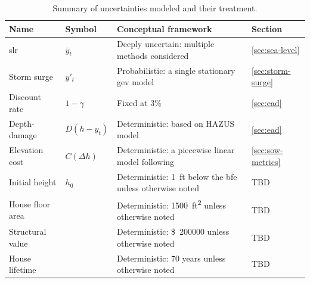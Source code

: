 \documentclass[12pt]{article}
\newcommand{\usd}[1]{\SI{#1}[\$]{}}
\begin{document}
\begin{table}
    \centering
    \caption{Summary of uncertainties modeled and their treatment.}\label{tab:uncertainties}
    \begin{tabular}{l l p{3in} l}
        \toprule
        Name             & Symbol           & Conceptual framework                                                                 & Section               \\
        \midrule
        \Gls{slr}        & $\overline{y}_t$ & Deeply uncertain: multiple methods considered                                        & \ref{sec:sea-level}   \\
        Storm surge      & $y'_t$           & Probabilistic: a single stationary \acrshort{gev} model                              & \ref{sec:storm-surge} \\
        Discount rate    & $1-\gamma$       & Fixed at 3\%                                                                         & \ref{sec:ead}         \\
        Depth-damage     & $D(h-y_t)$       & Deterministic: based on HAZUS model                                                  & \ref{sec:ead}         \\
        Elevation cost   & $C(\Delta h)$    & Deterministic: a piecewise linear model following \citet{zarekarizi_suboptimal:2020} & \ref{sec:sow-metrics} \\
        Initial height   & $h_0$            & Deterministic: \SI{1}{ft} below the \gls{bfe} unless otherwise noted                 & TBD                   \\
        House floor area &                  & Deterministic: \SI{1500}{ft^2} unless otherwise noted                                & TBD                   \\
        Structural value &                  & Deterministic: \usd{200000} unless otherwise noted                                   & TBD                   \\
        House lifetime   &                  & Deterministic: 70 years unless otherwise noted                                       & TBD                   \\
        \bottomrule
    \end{tabular}
\end{table}
\end{document}
